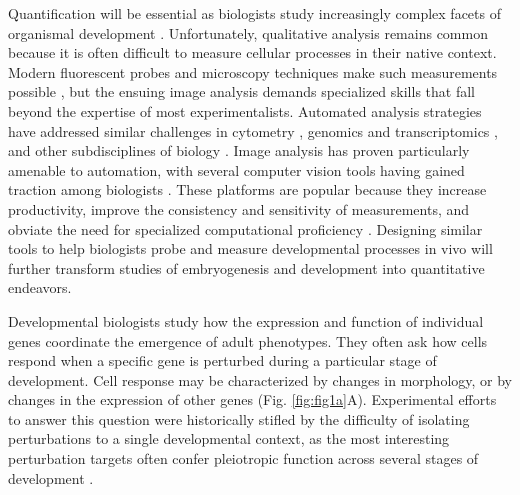 Quantification will be essential as biologists study increasingly complex facets of organismal development \cite{Oates2009}. Unfortunately, qualitative analysis remains common because it is often difficult to measure cellular processes in their native context. Modern fluorescent probes and microscopy techniques make such measurements possible \cite{Muzzey2009a,Stelzer2014,Truong2011}, but the ensuing image analysis demands specialized skills that fall beyond the expertise of most experimentalists. Automated analysis strategies have addressed similar challenges in cytometry \cite{Aghaeepour2013,Chen2015,Pyne2009}, genomics and transcriptomics \cite{Bernstein2008,Hellemans2007,Langmead2012,Trapnell2009}, and other subdisciplines of biology \cite{Costes2004,Kelley2015}. Image analysis has proven particularly amenable to automation, with several computer vision tools having gained traction among biologists \cite{Carpenter2006,Paintdakhi2016,Schindelin2012,Sommer2011}. These platforms are popular because they increase productivity, improve the consistency and sensitivity of measurements, and obviate the need for specialized computational proficiency \cite{Jug2014,Sbalzarini2016,Schindelin2015}. Designing similar tools to help biologists probe and measure developmental processes in vivo will further transform studies of embryogenesis and development into quantitative endeavors.

Developmental biologists study how the expression and function of individual genes coordinate the emergence of adult phenotypes. They often ask how cells respond when a specific gene is perturbed during a particular stage of development. Cell response may be characterized by changes in morphology, or by changes in the expression of other genes (Fig. \ref{fig:fig1a}A). Experimental efforts to answer this question were historically stifled by the difficulty of isolating perturbations to a single developmental context, as the most interesting perturbation targets often confer pleiotropic function across several stages of development \cite{IanSimpson2002,Parody1993,Shilo1991}. 

